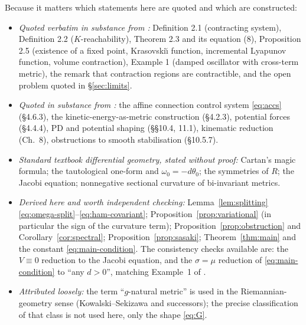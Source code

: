 \documentclass[11pt,a4paper]{article}
\theoremstyle{plain}
\theoremstyle{definition}
\theoremstyle{remark}
\begin{document}
Because it matters which statements here are quoted and which are constructed:

\begin{itemize}[leftmargin=1.6em,itemsep=3pt]
\item \emph{Quoted verbatim in substance from \cite{SB13}:} Definition 2.1
      (contracting system), Definition 2.2 ($K$-reachability), Theorem 2.3 and
      its equation (8), Proposition 2.5 (existence of a fixed point, Krasovski\u{\i}
      function, incremental Lyapunov function, volume contraction), Example 1
      (damped oscillator with cross-term metric), the remark that contraction
      regions are contractible, and the open problem quoted in
      \S\ref{sec:limits}.
\item \emph{Quoted in substance from \cite{BL04}:} the affine connection control
      system \eqref{eq:accs} (\S4.6.3), the kinetic-energy-as-metric construction
      (\S4.2.3), potential forces (\S4.4.4), PD and potential shaping
      (\S\S10.4, 11.1), kinematic reduction (Ch.~8), obstructions to smooth
      stabilisation (\S10.5.7).
\item \emph{Standard textbook differential geometry, stated without proof:}
      Cartan's magic formula; the tautological one-form and $\omega_0 = -d\theta_0$;
      the symmetries of $R$; the Jacobi equation; nonnegative sectional curvature
      of bi-invariant metrics.
\item \emph{Derived here and worth independent checking:} Lemma~\ref{lem:splitting}
      \eqref{eq:omega-split}--\eqref{eq:ham-covariant};
      Proposition~\ref{prop:variational} (in particular the sign of the curvature
      term); Proposition~\ref{prop:obstruction} and Corollary~\ref{cor:spectral};
      Proposition~\ref{prop:sasaki}; Theorem~\ref{thm:main} and the constant
      \eqref{eq:main-condition}. The consistency checks available are: the
      $V\equiv0$ reduction to the Jacobi equation, and the $\sigma=\mu$ reduction
      of \eqref{eq:main-condition} to ``any $d>0$'', matching Example~1 of
      \cite{SB13}.
\item \emph{Attributed loosely:} the term ``$g$-natural metric'' is used in the
      Riemannian-geometry sense (Kowalski--Sekizawa and successors); the precise
      classification of that class is not used here, only the shape \eqref{eq:G}.
\end{itemize}
\end{document}
